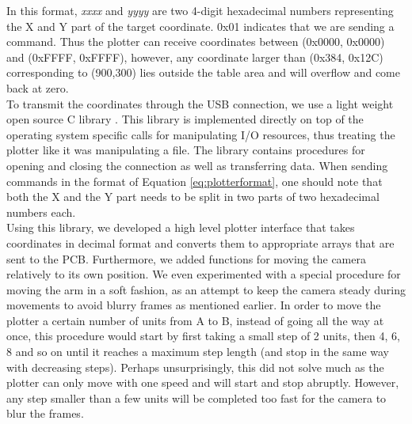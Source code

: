 In this format, \textit{xxxx} and \textit{yyyy} are two 4-digit hexadecimal numbers representing the X and Y part of the target coordinate. 0x01 indicates that we are sending a command. Thus the plotter can receive coordinates between (0x0000, 0x0000) and (0xFFFF, 0xFFFF), however, any coordinate larger than (0x384, 0x12C) corresponding to (900,300) lies outside the table area and will overflow and come back at zero. \\

To transmit the coordinates through the USB connection, we use a light weight open source C library \cite{rs232}. This library is implemented directly on top of the operating system specific calls for manipulating I/O resources, thus treating the plotter like it was manipulating a file. The library contains procedures for opening and closing the connection as well as transferring data. When sending commands in the format of Equation \ref{eq:plotterformat}, one should note that both the X and the Y part needs to be split in two parts of two hexadecimal numbers each. \\

Using this library, we developed a high level plotter interface that takes coordinates in decimal format and converts them to appropriate arrays that are sent to the PCB. Furthermore, we added functions for moving the camera relatively to its own position. We even experimented with a special procedure for moving the arm in a soft fashion, as an attempt to keep the camera steady during movements to avoid blurry frames as mentioned earlier. In order to move the plotter a certain number of units from A to B, instead of going all the way at once, this procedure would start by first taking a small step of 2 units, then 4, 6, 8 and so on until it reaches a maximum step length (and stop in the same way with decreasing steps). Perhaps unsurprisingly, this did not solve much as the plotter can only move with one speed and will start and stop abruptly. However, any step smaller than a few units will be completed too fast for the camera to blur the frames.


